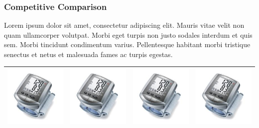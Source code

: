 \documentclass[11pt,a4paper,titlepage]{article}
\begin{document}
\subsubsection{Competitive Comparison}
Lorem ipsum dolor sit amet, consectetur adipiscing elit. Mauris vitae velit 
non quam ullamcorper volutpat. Morbi eget turpis non justo sodales interdum 
et quis sem. Morbi tincidunt condimentum varius. Pellentesque habitant morbi 
tristique senectus et netus et malesuada fames ac turpis egestas.\newline
\begin{tabular}{| m{92 pt} | m{92 pt} | m{92 pt} | m{92 pt} |}\hline
  \includegraphics[scale=0.30,bb=0 0 150 150]{prod_bpm1.jpg} & 
  \includegraphics[scale=0.30,bb=0 0 150 150]{prod_bpm2.jpg} & 
  \includegraphics[scale=0.25,bb=0 0 150 150]{prod_bpm3.jpg} & 
  \includegraphics[scale=0.20,bb=0 0 150 150]{prod_bpm4.jpg}\\\hline

\end{tabular}
\end{document}
